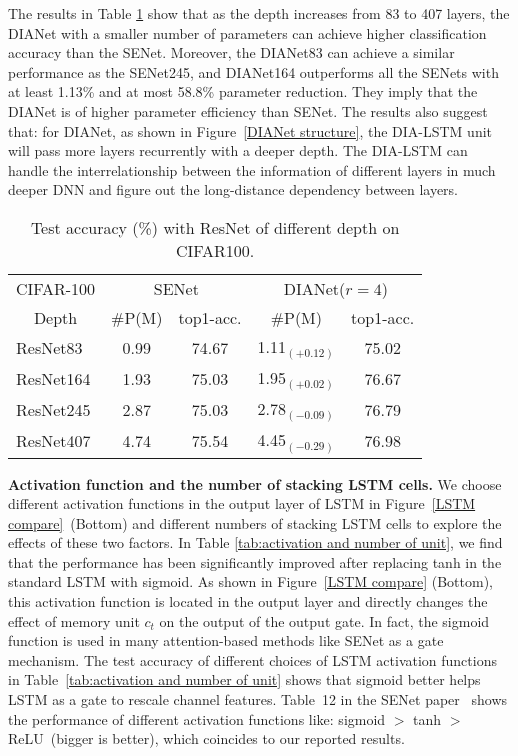 \documentclass[letterpaper]{article} \usepackage{aaai20}  \usepackage{times}  \usepackage{helvet} \usepackage{courier}  \usepackage[hyphens]{url}  \usepackage{graphicx} \urlstyle{rm} \def\UrlFont{\rm}  \usepackage{graphicx}  \frenchspacing  \setlength{\pdfpagewidth}{8.5in}  \setlength{\pdfpageheight}{11in}  \usepackage{color}
\begin{document}
	The results in Table \ref{tab:DIANet with different depth1} show that as the depth increases from 83 to 407 layers, the DIANet with a smaller number of parameters can achieve higher classification accuracy than the SENet. Moreover, the DIANet83 can achieve a similar performance as the SENet245, and DIANet164 outperforms all the SENets with at least 1.13\% and at most 58.8\% parameter reduction. They imply that the DIANet is of higher parameter efficiency than SENet. The results also suggest that: for DIANet, as shown in Figure~\ref{DIANet structure}, the DIA-LSTM unit will pass more layers recurrently with a deeper depth. The DIA-LSTM can handle the interrelationship between the information of different layers in much deeper DNN and figure out the long-distance dependency between layers. 
		\begin{table}[h]
	  		\small
			\centering
			\begin{tabular}{|l|c|c|c|c|}
				\toprule
				\multicolumn{1}{|c|}{CIFAR-100} & \multicolumn{2}{c|}{SENet} & \multicolumn{2}{c|}{DIANet($r=4$)} \\
				\cmidrule{2-5}    \multicolumn{1}{|c|}{Depth} & $\#$P(M) & top1-acc.  & $\#$P(M) & top1-acc. \\
				\midrule
				ResNet83 & 0.99  & 74.67  & 1.11$_{(+0.12)}$ & 75.02  \\
				ResNet164 & 1.93  & 75.03  & 1.95$_{(+0.02)}$ & 76.67  \\
				ResNet245 & 2.87  & 75.03  & 2.78$_{(-0.09)}$ & 76.79  \\
				ResNet407 & 4.74  & 75.54  & 4.45$_{(-0.29)}$ & 76.98  \\
				\bottomrule
			\end{tabular}\caption{Test accuracy (\%) with ResNet of different depth on CIFAR100.}
			\label{tab:DIANet with different depth1}\end{table}{}	

	\noindent\textbf{Activation function and the number of stacking LSTM cells.} We choose different activation functions in the output layer of LSTM in Figure~\ref{LSTM compare}~(Bottom) and different numbers of stacking LSTM cells to explore the effects of these two factors. 
	In Table \ref{tab:activation and number of unit}, we find that the performance has been significantly improved after replacing tanh in the standard LSTM with sigmoid. As shown in Figure~\ref{LSTM compare} (Bottom), this activation function is located in the output layer and directly changes the effect of memory unit $c_t$ on the output of the output gate. In fact, the sigmoid function is used in many attention-based methods like SENet as a gate mechanism. The test accuracy of different choices of LSTM activation functions in Table~\ref{tab:activation and number of unit} shows that sigmoid better helps LSTM as a gate to rescale channel features. Table~12 in the SENet paper~\cite{hu2018squeeze} shows the performance of different activation functions like: sigmoid $>$ tanh $>$ ReLU~(bigger is better), which coincides to our reported results.
	
\end{document}
